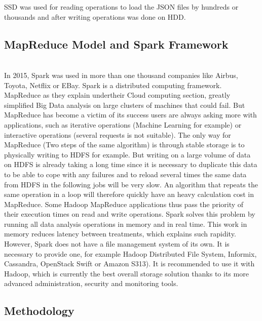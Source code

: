 \documentclass{acmtog} %
\begin{document}
SSD was used for reading operations to load the JSON files by hundreds or thousands and after writing operations was done on HDD.

\subsection{MapReduce Model and Spark Framework}
\label{subsub:mapreduce_spark}

~\\In 2015, Spark was used in more than one thousand companies like Airbus, Toyota, Netflix or EBay. Spark is a distributed computing framework. MapReduce \cite{Baltas17} as they explain undertheir Cloud computing section, greatly simplified Big Data \cite{Garg14} analysis on large clusters of machines that could fail. But MapReduce has become a victim of its success users are always asking more with applications, such as iterative operations (Machine Learning for example) or interactive operations (several requests is not suitable). The only way for MapReduce (Two steps of the same algorithm) is through stable storage is to physically writing to HDFS for example. But writing on a large volume of data on HDFS is already taking a long time since it is necessary to duplicate this data to be able to cope with any failures and to reload several times the same data from HDFS in the following jobs will be very slow. An algorithm that repeats the same operation in a loop will therefore quickly have an heavy calculation cost in MapReduce. Some Hadoop MapReduce applications thus pass the priority of their execution times on read and write operations.
Spark solves this problem by running all data analysis operations in memory and in real time. This work in memory reduces latency between treatments, which explains such rapidity.
However, Spark does not have a file management system of its own. It is necessary to provide one, for example Hadoop Distributed File System, Informix, Cassandra, OpenStack Swift or Amazon S313). It is recommended to use it with Hadoop, which is currently the best overall storage solution thanks to its more advanced administration, security and monitoring tools.


\subsection{Methodology}
\label{sec:methodology}
\end{document}

